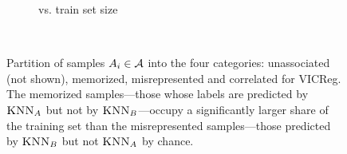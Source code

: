 \begin{figure}[ht]
\begin{minipage}[t]{0.49\textwidth}
\begin{subfigure}[b]{0.48\textwidth}
         \vspace{-1.5em}
         \caption{\dejavu vs. train set size}
         \label{fig:per sample v. n}
     \end{subfigure}~
     \vspace{-0.5em}
    \caption[Partition of samples $A_i \in \calA$ into the four categories]{
    Partition of samples $A_i \in \calA$ into the four categories: unassociated (not shown), memorized, misrepresented and correlated for VICReg. The memorized samples---those whose labels are predicted by $\textsc{KNN}_A$ but not by $\textsc{KNN}_B$---occupy a significantly larger share of the training set than the misrepresented samples---those predicted by $\textsc{KNN}_B$ but not $\textsc{KNN}_A$ by chance. %
    }
    \label{fig:partition attack main}
    \end{minipage}
\vspace{-1em} 
\end{figure}

\iffalse

